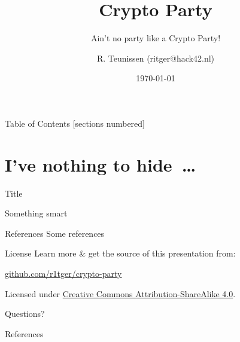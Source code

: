 \documentclass[aspectratio=169]{beamer}
\title{Crypto Party}
\subtitle{Ain't no party like a Crypto Party!}
\author{R. Teunissen (ritger@hack42.nl)}
\institute{OpenLabs, Tirana \& Hack42, Arnhem}
\date{\today}
\begin{document}
    \maketitle

    \begin{frame}{Table of Contents}
        [sections numbered]
        \tableofcontents[hideallsubsections]
    \end{frame}

    \section{I've nothing to hide~\ldots}

    {%
    \begin{frame}{Title}
        \begin{titlebox}
            \centering
            {Something smart}
        \end{titlebox}
    \end{frame}
    }

    \begin{frame}{References}
        Some references \cite{knuth92}
    \end{frame}

    \begin{frame}{License}
        Learn more \& get the source of this presentation from:
        \begin{center}\url{github.com/r1tger/crypto-party}\end{center}
        Licensed under \href{http://creativecommons.org/licenses/by-sa/4.0/}{Creative Commons Attribution-ShareAlike 4.0}.
        \begin{center}\ccbysa\end{center}
    \end{frame}

    \begin{frame}[standout]
        Questions?
    \end{frame}

    \appendix

    \begin{frame}[t,allowframebreaks]{References}
        
        
    \end{frame}
\end{document}
